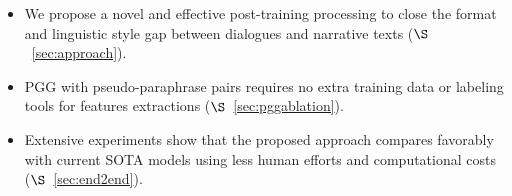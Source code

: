 

\begin{itemize}
\item We propose a novel and effective post-training processing to close 
the format and linguistic style gap between dialogues and narrative texts ($\S$~\ref{sec:approach}).
\item PGG with pseudo-paraphrase pairs requires no extra training data or 
labeling tools for features extractions ($\S$~\ref{sec:pggablation}).
\item Extensive experiments show that the proposed approach compares favorably with current SOTA models using less human efforts and computational costs ($\S$~\ref{sec:end2end}).
%
\end{itemize}
